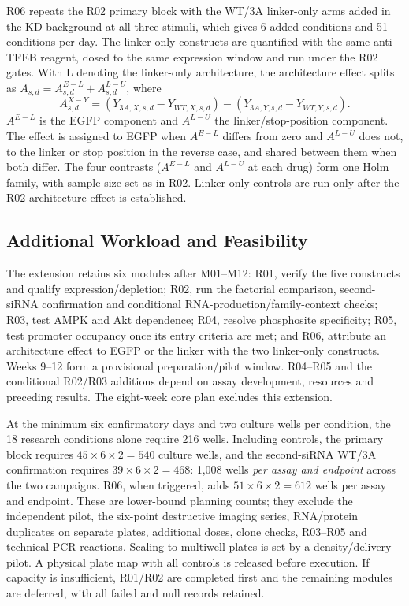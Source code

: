 R06 repeats the R02 primary block with the WT/3A linker-only arms added in the KD background at all three stimuli, which gives 6 added conditions and 51 conditions per day. The linker-only constructs are quantified with the same anti-TFEB reagent, dosed to the same expression window and run under the R02 gates. With L denoting the linker-only architecture, the architecture effect splits as $A_{s,d}=A^{E-L}_{s,d}+A^{L-U}_{s,d}$, where
\begin{equation}
A^{X-Y}_{s,d}=(Y_{3A,X,s,d}-Y_{WT,X,s,d})-(Y_{3A,Y,s,d}-Y_{WT,Y,s,d}).
\end{equation}
$A^{E-L}$ is the EGFP component and $A^{L-U}$ the linker/stop-position component. The effect is assigned to EGFP when $A^{E-L}$ differs from zero and $A^{L-U}$ does not, to the linker or stop position in the reverse case, and shared between them when both differ. The four contrasts ($A^{E-L}$ and $A^{L-U}$ at each drug) form one Holm family, with sample size set as in R02. Linker-only controls are run only after the R02 architecture effect is established.

\subsection{Additional Workload and Feasibility}
The extension retains six modules after M01--M12: R01, verify the five constructs and qualify expression/depletion; R02, run the factorial comparison, second-siRNA confirmation and conditional RNA-production/family-context checks; R03, test AMPK and Akt dependence; R04, resolve phosphosite specificity; R05, test promoter occupancy once its entry criteria are met; and R06, attribute an architecture effect to EGFP or the linker with the two linker-only constructs. Weeks 9--12 form a provisional preparation/pilot window. R04--R05 and the conditional R02/R03 additions depend on assay development, resources and preceding results. The eight-week core plan excludes this extension.

At the minimum six confirmatory days and two culture wells per condition, the 18 research conditions alone require 216 wells. Including controls, the primary block requires $45\times6\times2=540$ culture wells, and the second-siRNA WT/3A confirmation requires $39\times6\times2=468$: 1,008 wells \emph{per assay and endpoint} across the two campaigns. R06, when triggered, adds $51\times6\times2=612$ wells per assay and endpoint. These are lower-bound planning counts; they exclude the independent pilot, the six-point destructive imaging series, RNA/protein duplicates on separate plates, additional doses, clone checks, R03--R05 and technical PCR reactions. Scaling to multiwell plates is set by a density/delivery pilot. A physical plate map with all controls is released before execution. If capacity is insufficient, R01/R02 are completed first and the remaining modules are deferred, with all failed and null records retained.
\FloatBarrier

